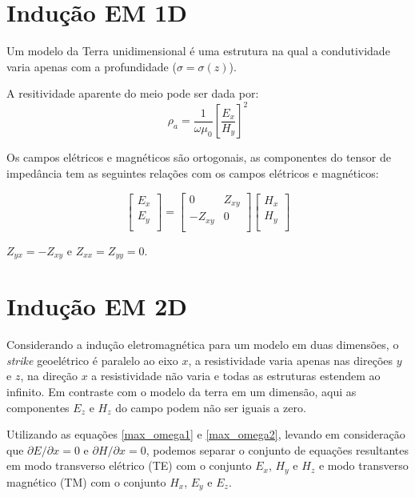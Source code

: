 \section{Indução EM 1D}

Um modelo da Terra unidimensional é uma estrutura na qual a condutividade varia apenas com a profundidade ($\sigma = \sigma(z)$).

A resitividade aparente do meio pode ser dada por:
\begin{equation}
	\rho_{a}=\frac{1}{\omega\mu_{0}}\left[\frac{E_{x}}{H_{y}}\right]^2
\end{equation}

Os campos elétricos e magnéticos são ortogonais, as componentes do tensor de impedância tem as seguintes relações com os campos elétricos e magnéticos:

	\begin{equation}
	\left[\begin{array}{c}
	E_{x} \\
	E_{y} \\
	\end{array}\right] =
	\left[\begin{array}{cc}
	0 &  Z_{xy} \\
	-Z_{xy} &  0 \\
	\end{array}\right]	\left[\begin{array}{c}
	H_{x} \\
	H_{y} \\
	\end{array}\right]
	\end{equation}
	
$Z_{yx}=-Z_{xy}$ e $Z_{xx}=Z_{yy}=0$.	
	
\section{Indução EM 2D}

Considerando a indução eletromagnética para um modelo em duas dimensões, o \textit{strike} geoelétrico é paralelo ao eixo $x$, a resistividade varia apenas nas direções $y$ e $z$,  na direção $x$ a resistividade não varia e todas as estruturas estendem ao infinito. Em contraste com o modelo da terra em um dimensão, aqui as componentes $E_{z}$ e $H_{z}$ do campo podem não ser iguais a zero.

Utilizando as equações \eqref{max_omega1} e \eqref{max_omega2}, levando em consideração que $\partial E/ \partial x=0$ e $\partial H/\partial x=0$, podemos separar o conjunto de equações resultantes em modo transverso elétrico (TE) com o conjunto $E_{x}$, $H_{y}$ e $H_{z}$ e modo transverso magnético (TM) com o conjunto $H_{x}$, $E_{y}$ e $E_{z}$.

